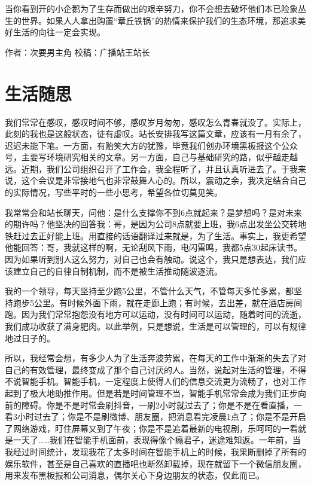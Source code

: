\documentclass[
]{book}
\begin{document}
当你看到开的小企鹅为了生存而做出的艰辛努力，你不会想去破坏他们本已险象丛生的世界。如果人人拿出购置``章丘铁锅''的热情来保护我们的生态环境，那追求美好生活的向往一定会实现。

作者：次要男主角
校稿：广播站王站长

\hypertarget{ux751fux6d3bux968fux601d}{%
\section{生活随思}\label{ux751fux6d3bux968fux601d}}

我们常常在感叹，感叹时间不够，感叹岁月匆匆，感叹怎么青春就没了。实际上，此刻的我也是这般状态，徒有虚叹。站长安排我写这篇文章，应该有一月有余了，迟迟未能下笔。一方面，有贻笑大方的犹豫，毕竟我们创办环境黑板报这个公众号，主要写环境研究相关的文章。另一方面，自己与基础研究的路，似乎越走越远。近期，我们公司组织召开了工作会，我全程听了，并且认真听进去了。于我来说，这个会议是非常接地气也非常鼓舞人心的。所以，震动之余，我决定结合自己的实际情况，写些平时的一些小思考，希望各位切莫见笑。

我常常会和站长聊天，问他：是什么支撑你不到6点就起来？是梦想吗？是对未来的期许吗？他坚决的回答我：哥，是因为公司8点就要上班，我6点出发坐公交转地铁赶过去正好能上班。用直接的话语翻译过来就是，为了生活。事实上，我更希望他能回答：哥，我就这样的啊，无论刮风下雨，电闪雷鸣，我都5点30起床读书。因为如果听到别人这么努力，对自己也会有触动。说这个，我只是想表达，我们应该建立自己的自律自制机制，而不是被生活推动随波逐流。

我的一个领导，每天坚持至少跑5公里，不管什么天气，不管每天多忙多累，都坚持跑步5公里。有时候外面下雨，就在走廊上跑；有时候，去出差，就在酒店房间跑。因为我们常常抱怨没有地方可以运动，没有时间可以运动，随着时间的流逝，我们成功收获了满身肥肉。以此举例，只是想说，生活是可以管理的，可以有规律地过日子的。

所以，我经常会想，有多少人为了生活奔波劳累，在每天的工作中渐渐的失去了对自己的有效管理，最终变成了那个自己讨厌的人。当然，说起对生活的管理，不得不说智能手机。智能手机，一定程度上使得人们的信息交流更为流畅了，也对工作起到了极大地助推作用。但是若是时间管理不当，智能手机常常会成为我们正步向前的障碍。你是不是时常会刷抖音，一刷2小时就过去了；你是不是在看直播，一看3小时过去了；你是不是刷微博、朋友圈，把消息看完凌晨1点了；你是不是开启了网络游戏，盯住屏幕又到了午夜；你是不是追着最新的电视剧，乐呵呵的一看就是一天了\ldots\ldots 我们在智能手机面前，表现得像个瘾君子，迷途难知返。一年前，当我经过时间统计，发现我花了太多时间在智能手机上的时候，我果断删掉了所有的娱乐软件，甚至是自己喜欢的直播吧也断然卸载掉，现在就留下一个微信朋友圈，用来发布黑板报和公司消息，偶尔关心下身边朋友的状态，仅此而已。
\end{document}
